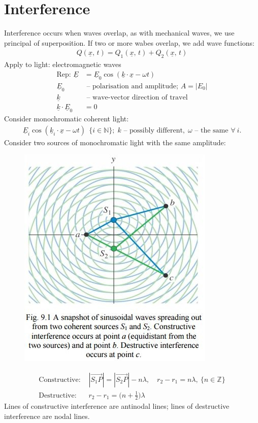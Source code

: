 \documentclass[a4paper, 11pt, normalem]{report}
\begin{document}
\section{Interference}
Interference occurs when waves overlap, as with mechanical waves, we use principal of superposition.
If two or more wabes overlap, we add wave functions:
\begin{align}
    Q(\underline{x},\,t) = Q_{1}(\underline{x},\,t) + Q_{2}(\underline{x},\,t)
\end{align}
Apply to light: electromagnetic waves
\begin{align}
    \text{Rep: }\underline{E} &= \underline{E}_{0}\cos{(\underline{k}\cdot\underline{x} - \omega t)} \\
    \underline{E}_{0}&\text{ -- polarisation and amplitude; }A = |E_{0}| \\
    \underline{k}&\text{ -- wave-vector direction of travel} \\
    \underline{k}\cdot\underline{E}_{0} &= 0
\end{align}
Consider monochromatic coherent light:
\begin{align}
    \underline{E}_{i}\cos{(\underline{k}_{i}\cdot\underline{x} - \omega t)}~~\{i \in \mathbb{N}\};\; k\text{ -- possibly different},\; \omega\text{ -- the same }\forall ~i.
\end{align}
Consider two sources of monochromatic light with the same amplitude:
\begin{figure}[H]
    \centering
    \includegraphics{Construc.jpg}
\end{figure}
\begin{align}
    \text{Constructive: }&|\overrightarrow{S_{1}P}| = |\overrightarrow{S_{2}P}| - n\lambda,\quad r_{2} - r_{1} = n\lambda, ~\{n \in \mathbb{Z}\} \\
    \text{Destructive: }&r_{2} - r_{1} = \Big(n + \frac{1}{2}\Big)\lambda
\end{align}
Lines of constructive interference are antinodal lines; lines of destructive interference are nodal lines.
\end{document}
